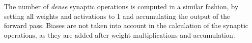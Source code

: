 
The number of \textit{dense} synaptic operations is computed in a similar fashion, by setting all weights and activations to 1 and accumulating the output of the forward pass.
Biases are not taken into account in the calculation of the synaptic operations, as they are added after weight multiplications and accumulation. 

